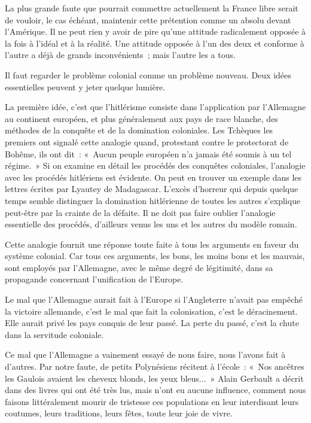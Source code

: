 \documentclass[french,twoside]{book} %
\begin{document}
La plus grande faute que pourrait commettre actuellement la France libre serait de vouloir, le cas échéant, maintenir cette prétention comme un absolu devant l'Amérique. Il ne peut rien y avoir de pire qu'une attitude radicalement opposée à la fois à l'idéal et à la réalité. Une attitude opposée à l'un des deux et conforme à l'autre a déjà de grands inconvénients ; mais l'autre les a tous.\par
Il faut regarder le problème colonial comme un problème nouveau. Deux idées essentielles peuvent y jeter quelque lumière.\par
La première idée, c'est que l'hitlérisme consiste dans l'application par l'Allemagne au continent européen, et plus généralement aux pays de race blanche, des méthodes de la conquête et de la domination coloniales. Les Tchèques les premiers ont signalé cette analogie quand, protestant contre le protectorat de Bohême, ils ont dit : « Aucun peuple européen n'a jamais été soumis à un tel régime. » Si on examine en détail les procédés des conquêtes coloniales, l'analogie avec les procédés hitlériens est évidente. On peut en trouver un exemple dans les lettres écrites par Lyautey de Madagascar. L'excès d'horreur qui depuis quelque temps semble distinguer la domination hitlérienne de toutes les autres s'explique peut-être par la crainte de la défaite. Il ne doit pas faire oublier l'analogie essentielle des procédés, d'ailleurs venus les uns et les autres du modèle romain.\par
Cette analogie fournit une réponse toute faite à tous les arguments en faveur du système colonial. Car tous ces arguments, les bons, les moins bons et les mauvais, sont employés par l'Allemagne, avec le même degré de légi­timité, dans sa propagande concernant l'unification de l'Europe.\par
Le mal que l'Allemagne aurait fait à l'Europe si l'Angleterre n'avait pas empêché la victoire allemande, c'est le mal que fait la colonisation, c'est le déracinement. Elle aurait privé les pays conquis de leur passé. La perte du passé, c'est la chute dans la servitude coloniale.\par
Ce mal que l'Allemagne a vainement essayé de nous faire, nous l'avons fait à d'autres. Par notre faute, de petits Polynésiens récitent à l'école : « Nos ancêtres les Gaulois avaient les cheveux blonds, les yeux bleus... » Alain Gerbault a décrit dans des livres qui ont été très lus, mais n'ont eu aucune influence, comment nous faisons littéralement mourir de tristesse ces popula­tions en leur interdisant leurs coutumes, leurs traditions, leurs fêtes, toute leur joie de vivre.\par
\end{document}
